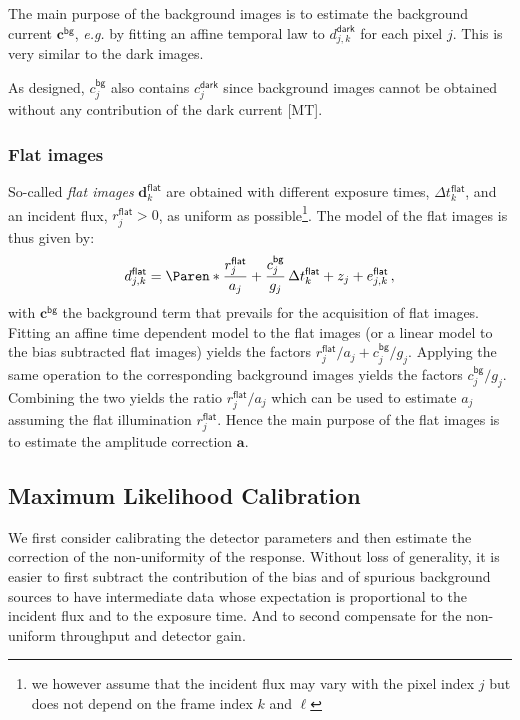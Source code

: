 \documentclass[a4paper,11pt,twoside]{scrartcl}
\newcommand{\oops}[1]{\textcolor[named]{BrickRed}{#1}}
\newcommand*{\eg}{\emph{e.g.}\xspace}
\newcommand*{\Tag}[1]{\mathsf{#1}}
\newcommand*{\V}[1]{\boldsymbol{#1}}   %
\theoremstyle{plain} %
\theoremstyle{definition}
\theoremstyle{remark}
\begin{document}
The main purpose of the background images is to estimate the background current
 $\V c^\Tag{bg}$, \eg by fitting an affine temporal law to $d_{j,k}^\Tag{dark}$
for each pixel $j$.  \oops{This is very similar to the dark images.}

\oops{As designed, $c^\Tag{bg}_j$ also contains $c^\Tag{dark}_j$ since
background images cannot be obtained without any contribution of the dark
current [MT].}


\subsubsection{Flat images}

So-called \emph{flat images} $\V d_{k}^\Tag{flat}$ are obtained with
different exposure times, $\Delta t_k^\Tag{flat}$, and an incident flux,
$r_j^\Tag{flat} > 0$, as uniform as possible\footnote{we however assume that
  the incident flux may vary with the pixel index $j$ but does not depend on
  the frame index $k$ and $\ell$}.  The model of the flat images is thus given
  by:
\begin{equation}
  d_{j,k}^\Tag{flat} =
  \Paren*{
    \frac{r_j^\Tag{flat}}{a_j} +
    \frac{c^\Tag{bg}_j}{g_j}
  }\,\Delta t_k^\Tag{flat}
   + z_j + e_{j,k}^\Tag{flat} \, ,
  \label{eq:flat-model}
\end{equation}
with $\V c^\Tag{bg}$ the background term that prevails for the acquisition of
flat images.  Fitting an affine time dependent model to the flat images (or a
linear model to the bias subtracted flat images) yields the factors
$r_j^\Tag{flat}/a_j + c^\Tag{bg}_j/g_j$. Applying the same operation to the
corresponding background images yields the factors $c^\Tag{bg}_j/g_j$.
Combining the two yields the ratio $r_j^\Tag{flat}/a_j$ which can be used to
estimate $a_j$ assuming the flat illumination $r_j^\Tag{flat}$. Hence the
main purpose of the flat images is to estimate the amplitude correction $\V a$.



\subsection{Maximum Likelihood Calibration}


We first consider calibrating the detector parameters and then estimate the
correction of the non-uniformity of the response.  Without loss of generality,
it is easier to first subtract the contribution of the bias and of spurious
background sources to have intermediate data whose expectation is proportional
to the incident flux and to the exposure time. And to second compensate for
the non-uniform throughput and detector gain.
\end{document}
